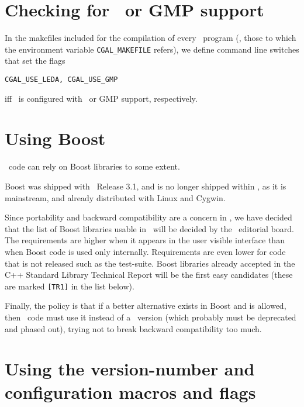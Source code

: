 \section{Checking for \leda\ or GMP support\label{sec:leda_gmp_support}}

In the makefiles included for the compilation of every \cgal\ program
(\ie, those to which the environment variable {\tt CGAL\_MAKEFILE} refers),
we define command line switches that set the flags 
\begin{verbatim}
CGAL_USE_LEDA, CGAL_USE_GMP
\end{verbatim}
iff \cgal\ is configured with \leda\ or GMP support, respectively.

\section{Using Boost\label{sec:boost_support}}
\cgal\ code can rely on Boost libraries to some extent.

Boost was shipped with \cgal\ Release 3.1, and is no longer
shipped within \cgal, as it is mainstream, and already distributed
with Linux and Cygwin.  

Since portability and backward compatibility are a concern in \cgal,
we have decided that the list of Boost libraries usable in \cgal\ will be
decided by the \cgal\ editorial board.  The requirements are higher
when it appears in the user visible interface than when Boost code
is used only internally.  Requirements are even lower for code that
is not released such as the test-suite.  Boost libraries already accepted
in the C++ Standard Library Technical Report will be the first easy
candidates (these are marked \texttt{[TR1]} in the list below).

Finally, the policy is that if a better alternative exists in Boost and is
allowed, then \cgal\ code must use it instead of a \cgal\ version (which
probably must be deprecated and phased out), trying not to break backward
compatibility too much.


\section{Using the version-number and configuration macros and flags\label{sec:using_version_macros}}

